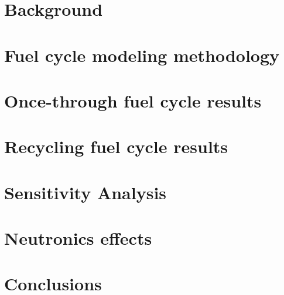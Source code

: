 \documentclass[edeposit,fullpage]{uiucthesis2018}
\begin{document}
\chapter{Background}


\chapter{Fuel cycle modeling methodology}


\chapter{Once-through fuel cycle results}


\chapter{Recycling fuel cycle results}


\chapter{Sensitivity Analysis}


\chapter{Neutronics effects}


\chapter{Conclusions}


%

\backmatter



\end{document}
